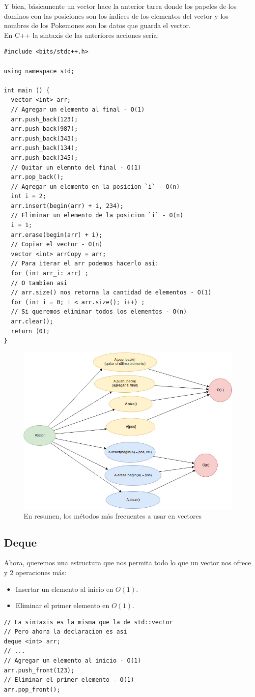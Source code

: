 \documentclass[a4paper,12pt]{article}
\begin{document}
Y bien, básicamente un vector hace la anterior tarea donde los papeles de los dominos con las posiciones son los índices de los elementos del vector y los nombres de los Pokemones son los datos que guarda el vector.\\
En C++ la sintaxis de las anteriores acciones sería:
\begin{lstlisting}
#include <bits/stdc++.h>

using namespace std;

int main () {
  vector <int> arr;
  // Agregar un elemento al final - O(1)
  arr.push_back(123);
  arr.push_back(987);
  arr.push_back(343);
  arr.push_back(134);
  arr.push_back(345);
  // Quitar un elemnto del final - O(1)
  arr.pop_back();
  // Agregar un elemento en la posicion `i` - O(n)
  int i = 2;
  arr.insert(begin(arr) + i, 234);
  // Eliminar un elemento de la posicion `i` - O(n)
  i = 1;
  arr.erase(begin(arr) + i);
  // Copiar el vector - O(n)
  vector <int> arrCopy = arr;
  // Para iterar el arr podemos hacerlo asi:
  for (int arr_i: arr) ;
  // O tambien asi
  // arr.size() nos retorna la cantidad de elementos - O(1)
  for (int i = 0; i < arr.size(); i++) ;
  // Si queremos eliminar todos los elementos - O(n)
  arr.clear();
  return (0);
}
\end{lstlisting}
\begin{figure}[H]
\centering
\includegraphics[scale=0.6]{vector}
\caption{En resumen, los métodos más frecuentes a usar en vectores}
\end{figure}
\subsection*{Deque}
Ahora, queremos una estructura que nos permita todo lo que un vector nos ofrece y 2 operaciones más:
\begin{itemize}
\item Insertar un elemento al inicio en $O(1)$.
\item Eliminar el primer elemento en $O(1)$.
\end{itemize}
\begin{lstlisting}
// La sintaxis es la misma que la de std::vector
// Pero ahora la declaracion es asi
deque <int> arr;
// ...
// Agregar un elemento al inicio - O(1)
arr.push_front(123);
// Eliminar el primer elemento - O(1)
arr.pop_front();
\end{lstlisting}
\end{document}
